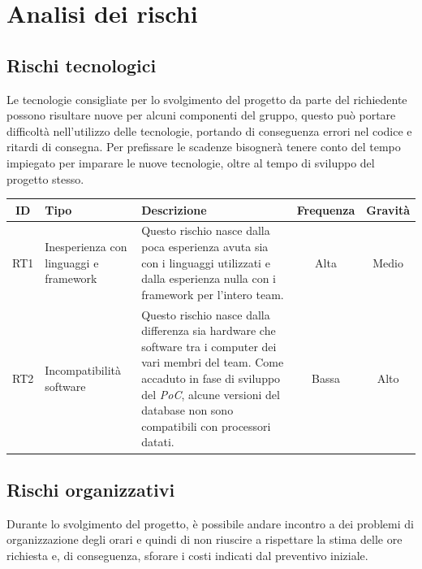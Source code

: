 \documentclass[a4paper, 12pt]{article}
\begin{document}
\makeindexdetails
\makefrontpage \makeversioni
\tableofcontents
\newpage
\clearpage
{} 

\section{Analisi dei rischi}

\subsection{Rischi tecnologici}
Le tecnologie consigliate per lo svolgimento del progetto da parte del richiedente possono risultare nuove per alcuni componenti del gruppo, questo può portare difficoltà nell'utilizzo delle tecnologie, portando di conseguenza errori nel codice e ritardi di consegna. \newline
Per prefissare le scadenze bisognerà tenere conto del tempo impiegato per imparare le nuove tecnologie, oltre al tempo di sviluppo del progetto stesso.

\begin{center}
\begin{tabularx}{\textwidth}{||c|X|X|c|c||}
    \hline
    \textbf{ID} & \textbf{Tipo} & \textbf{Descrizione} & \textbf{Frequenza} & \textbf{Gravità} \\
    \hline \hline
    RT1 & Inesperienza con linguaggi e framework & Questo rischio nasce dalla poca esperienza avuta sia con i linguaggi utilizzati e dalla esperienza nulla con i framework per l'intero team. & Alta & Medio \\
    \hline
    RT2 & Incompatibilità software & Questo rischio nasce dalla differenza sia hardware che software tra i computer dei vari membri del team. Come accaduto in fase di sviluppo del \textit{PoC}, alcune versioni del database non sono compatibili con processori datati. & Bassa & Alto\\
\hline \hline
\end{tabularx}
\end{center}

\subsection{Rischi organizzativi}
Durante lo svolgimento del progetto, è possibile andare incontro a dei problemi di organizzazione degli orari e quindi di non riuscire a rispettare la stima delle ore richiesta e, di conseguenza, sforare i costi indicati dal preventivo iniziale.
\end{document}
